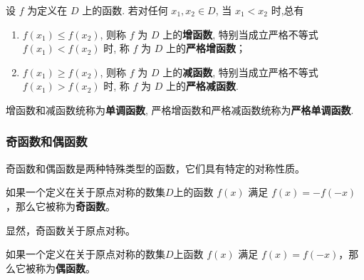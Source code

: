 \documentclass[lang=cn,newtx,10pt,scheme=chinese]{elegantbook}
\begin{document}
\begin{definition}
    设 $f$ 为定义在 $D$ 上的函数. 若对任何 $x_1, x_2 \in D$, 当 $x_1<x_2$ 时,总有
    \begin{enumerate}
        \item $f\left(x_1\right) \leqslant f\left(x_2\right)$, 则称 $f$ 为 $D$ 上的\textcolor{third}{\bf 增函数}, 特别当成立严格不等式 $f\left(x_1\right)<f\left(x_2\right)$ 时, 称 $f$ 为 $D$ 上的\textcolor{third}{\bf 严格增函数}；
        \item $f\left(x_1\right) \geqslant f\left(x_2\right)$, 则称 $f$ 为 $D$ 上的\textcolor{third}{\bf 减函数}, 特别当成立严格不等式 $f\left(x_1\right)> f\left(x_2\right)$ 时, 称 $f$ 为 $D$ 上的\textcolor{third}{\bf 严格减函数}.
    \end{enumerate}
\end{definition}

增函数和减函数统称为\textcolor{third}{\bf 单调函数}, 严格增函数和严格减函数统称为\textcolor{third}{\bf 严格单调函数}.




\subsubsection{奇函数和偶函数}

奇函数和偶函数是两种特殊类型的函数，它们具有特定的对称性质。

\begin{definition}[奇函数]
    如果一个定义在关于原点对称的数集$D$上的函数 \( f(x) \) 满足 \( f(x) = -f(-x) \)，那么它被称为\textcolor{third}{\bf 奇函数}。
\end{definition}

显然，奇函数关于原点对称。

\begin{definition}[偶函数]
    如果一个定义在关于原点对称的数集$D$上函数 \( f(x) \) 满足 \( f(x) = f(-x) \)，那么它被称为\textcolor{third}{\bf 偶函数}。
\end{definition}
\end{document}
